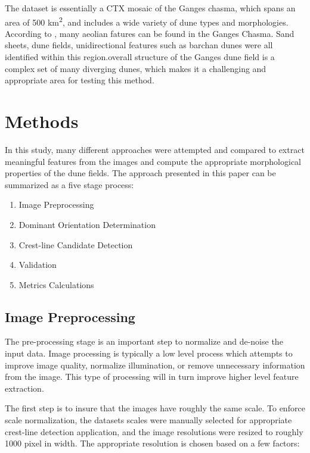 \documentclass[review]{elsarticle}
\begin{document}
The dataset is essentially a CTX mosaic of the Ganges chasma, which spans an area of 500 km\textsuperscript{2}, and includes a wide variety of dune types and morphologies. According to \cite{fenton_aeolian_sediment_ganges_chasma_mars}, many aeolian fatures can be found in the Ganges Chasma. Sand sheets, dune fields, unidirectional features such as barchan dunes were all identified within this region.overall structure of the Ganges dune field is a complex set of many diverging dunes, which makes it a challenging and appropriate area for testing this method. 

\section{Methods}

In this study, many different approaches were attempted and compared to extract meaningful features from the images and compute the appropriate morphological properties of the dune fields. The approach presented in this paper can be summarized as a five stage process:

\begin{enumerate}
	\item Image Preprocessing
	\item Dominant Orientation Determination
	\item Crest-line Candidate Detection
	\item Validation
	\item Metrics Calculations
\end{enumerate}

\subsection{Image Preprocessing}

The pre-processing stage is an important step to normalize and de-noise the input data. Image processing is typically a low level process which attempts to improve image quality, normalize illumination, or remove unnecessary information from the image. This type of processing will in turn improve higher level feature extraction.

The first step is to insure that the images have roughly the same scale. To enforce scale normalization, the datasets scales were manually selected for appropriate crest-line detection application, and the image resolutions were resized to roughly 1000 pixel in width. The appropriate resolution is chosen based on a few factors:
\end{document}
